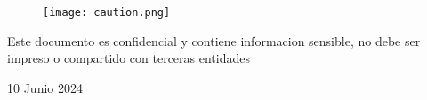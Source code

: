 \documentclass[a4paper]{article}
\newcommand{\FechaDocumento}{10 Junio 2024}
\begin{document}
    \begin{figure}
        \centering
        \null\par\vspace{2cm}
        \texttt{[image: caution.png]}
    \end{figure}
    
    \null\par\vspace{2cm}
    \begin{center} 
        \begin{tcolorbox}[colback=red!5!white, colframe=red!90!black]
            \centering
            \Large Este documento es confidencial y contiene informacion sensible, no debe ser impreso o compartido con terceras entidades 
            
        \end{tcolorbox}
        
        \par\vspace{0.7cm}
        \large \FechaDocumento
    \end{center}
\end{document}
